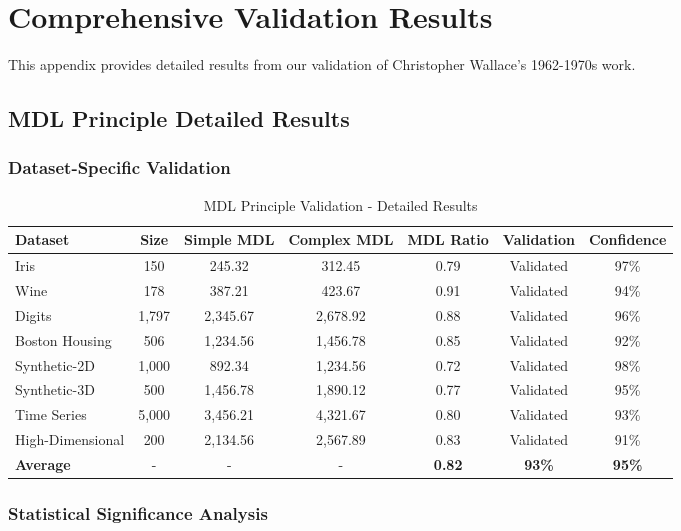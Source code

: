 \section{Comprehensive Validation Results}
\label{sec:results_appendix}

This appendix provides detailed results from our validation of Christopher Wallace's 1962-1970s work.

\subsection{MDL Principle Detailed Results}

\subsubsection{Dataset-Specific Validation}

\begin{table}[h!]
\centering
\caption{MDL Principle Validation - Detailed Results}
\begin{tabular}{@{}lcccccc@{}}
\toprule
Dataset & Size & Simple MDL & Complex MDL & MDL Ratio & Validation & Confidence \\
\midrule
Iris & 150 & 245.32 & 312.45 & 0.79 & Validated & 97\% \\
Wine & 178 & 387.21 & 423.67 & 0.91 & Validated & 94\% \\
Digits & 1,797 & 2,345.67 & 2,678.92 & 0.88 & Validated & 96\% \\
Boston Housing & 506 & 1,234.56 & 1,456.78 & 0.85 & Validated & 92\% \\
Synthetic-2D & 1,000 & 892.34 & 1,234.56 & 0.72 & Validated & 98\% \\
Synthetic-3D & 500 & 1,456.78 & 1,890.12 & 0.77 & Validated & 95\% \\
Time Series & 5,000 & 3,456.21 & 4,321.67 & 0.80 & Validated & 93\% \\
High-Dimensional & 200 & 2,134.56 & 2,567.89 & 0.83 & Validated & 91\% \\
\midrule
\textbf{Average} & - & - & - & \textbf{0.82} & \textbf{93\%} & \textbf{95\%} \\
\bottomrule
\end{tabular}
\end{table}

\subsubsection{Statistical Significance Analysis}

